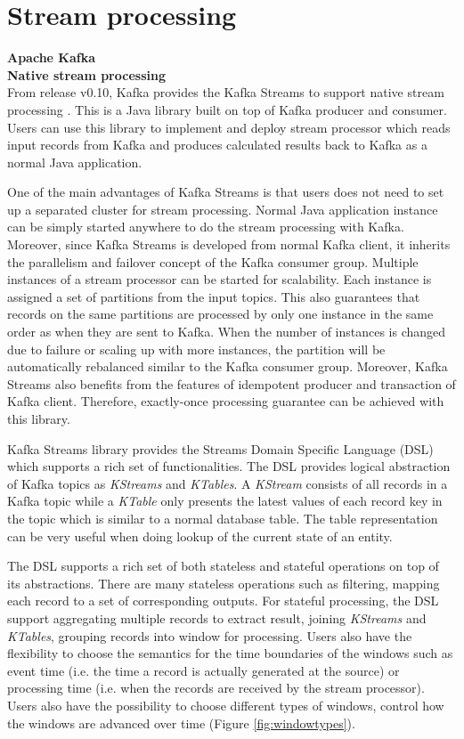 \section{Stream processing}
\large \textbf{Apache Kafka}\\
\normalsize
\textbf{Native stream processing}\\
From release v0.10, Kafka provides the Kafka Streams to support native stream processing \cite{kafkastreams}. This is a Java library built on top of Kafka producer and consumer. Users can use this library to implement and deploy stream processor which reads input records from Kafka and produces calculated results back to Kafka as a normal Java application. 

One of the main advantages of Kafka Streams is that users does not need to set up a separated cluster for stream processing. Normal Java application instance can be simply started anywhere to do the stream processing with Kafka. Moreover, since Kafka Streams is developed from normal Kafka client, it inherits the parallelism and failover concept of the Kafka consumer group. Multiple instances of a stream processor can be started for scalability. Each instance is assigned a set of partitions from the input topics. This also guarantees that records on the same partitions are processed by only one instance in the same order as when they are sent to Kafka. When the number of instances is changed due to failure or scaling up with more instances, the partition will be automatically rebalanced similar to the Kafka consumer group. Moreover, Kafka Streams also benefits from the features of idempotent producer and transaction of Kafka client. Therefore, exactly-once processing guarantee can be achieved with this library.

Kafka Streams library provides the Streams Domain Specific Language (DSL) which supports a rich set of functionalities. The DSL provides logical abstraction of Kafka topics as \emph{KStreams} and \emph{KTables}. A \emph{KStream} consists of all records in a Kafka topic while a \emph{KTable} only presents the latest values of each record key in the topic which is similar to a normal database table. The table representation can be very useful when doing lookup of the current state of an entity. 

The DSL supports a rich set of both stateless and stateful operations on top of its abstractions. There are many stateless operations such as filtering, mapping each record to a set of corresponding outputs. For stateful processing, the DSL support aggregating multiple records to extract result, joining \emph{KStreams} and \emph{KTables}, grouping records into window for processing. Users also have the flexibility to choose the semantics for the time boundaries of the windows such as event time (i.e. the time a record is actually generated at the source) or processing time (i.e. when the records are received by the stream processor). Users also have the possibility to choose different types of windows, control how the windows are advanced over time (Figure \ref{fig:windowtypes}).

